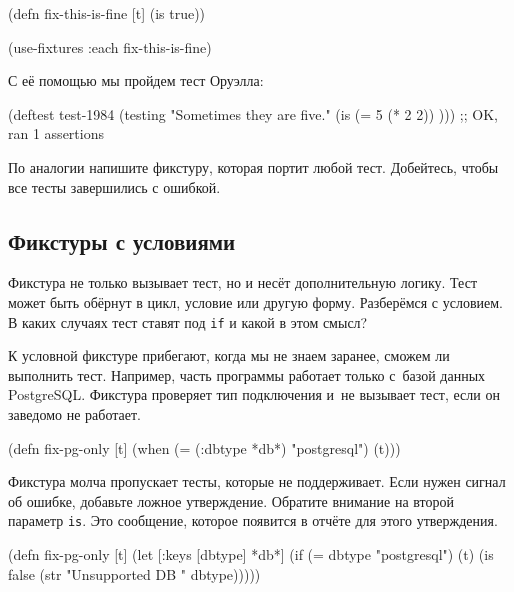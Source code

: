 \begin{english}
  \begin{clojure}
(defn fix-this-is-fine [t]
  (is true))

(use-fixtures :each fix-this-is-fine)
  \end{clojure}
\end{english}


\noindent
С её помощью мы пройдем тест Оруэлла:

\begin{english}
  \begin{clojure}
(deftest test-1984
  (testing "Sometimes they are five."
    (is (= 5 (* 2 2)) )))
;; OK, ran 1 assertions
  \end{clojure}
\end{english}

По аналогии напишите фикстуру, которая портит любой тест. Добейтесь, чтобы все
тесты завершились с ошибкой.

\subsection{Фикстуры с условиями}


Фикстура не только вызывает тест, но и несёт дополнительную логику. Тест может
быть обёрнут в цикл, условие или другую форму. Разберёмся с условием. В
каких случаях тест ставят под \verb|if| и какой в этом смысл?

К условной фикстуре прибегают, когда мы не знаем заранее, сможем ли выполнить
тест. Например, часть программы работает только с~базой данных
PostgreSQL. Фикстура проверяет тип подключения и~не вызывает тест, если он
заведомо не работает.

\begin{english}
  \begin{clojure}
(defn fix-pg-only [t]
  (when (= (:dbtype *db*) "postgresql")
    (t)))
  \end{clojure}
\end{english}

Фикстура молча пропускает тесты, которые не поддерживает. Если нужен сигнал об
ошибке, добавьте ложное утверждение. Обратите внимание на второй параметр
\verb|is|. Это сообщение, которое появится в отчёте для этого утверждения.

\begin{english}
  \begin{clojure}
(defn fix-pg-only [t]
  (let [{:keys [dbtype]} *db*]
    (if (= dbtype "postgresql")
      (t)
      (is false (str "Unsupported DB " dbtype)))))
  \end{clojure}
\end{english}

